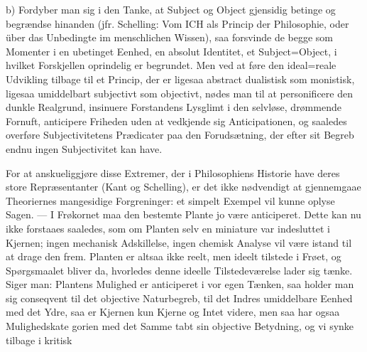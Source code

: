 \documentclass[12pt]{book}
\newcommand{\opage}[1]{\marginnote{\footnotesize\textit{[#1]}}}
\begin{document}
b) Fordyber man sig i den Tanke, at Subject og Object gjensidig betinge og begrændse
hinanden (jfr. Schelling: Vom ICH als Princip der Philosophie, oder über das Unbedingte
im menschlichen Wissen), saa forsvinde de begge som Momenter i en ubetinget Eenhed, en
absolut Identitet, et Subject=Object, i hvilket Forskjellen oprindelig er begrundet. Men
ved at føre den ideal=reale Udvikling tilbage til et Princip, der er ligesaa abstract
dualistisk som monistisk, ligesaa umiddelbart subjectivt som objectivt, nødes man til at
personificere den dunkle Realgrund, insinuere Forstandens Lysglimt i den selvløse,
drømmende Fornuft, anticipere Friheden uden at vedkjende sig Anticipationen, og saaledes
overføre Subjectivitetens Prædicater paa den Forudsætning, der efter sit Begreb endnu
ingen Subjectivitet kan have.

For at anskueliggjøre disse Extremer, der i Philosophiens Historie have deres store
Repræsentanter (Kant og Schelling), er det ikke nødvendigt at gjennemgaae Theoriernes
mangesidige Forgreninger: et simpelt Exempel vil kunne oplyse Sagen. --- I Frøkornet
maa den bestemte Plante jo være anticiperet. Dette kan nu ikke forstaaes saaledes, som
om Planten selv en miniature var indesluttet i Kjernen; ingen mechanisk Adskillelse,
ingen chemisk Analyse vil være istand til at drage den frem. Planten er altsaa ikke
reelt, men ideelt tilstede i Frøet, og Spørgsmaalet bliver da, hvorledes denne ideelle
Tilstedeværelse lader sig tænke. Siger man: Plantens Mulighed er anticiperet i vor egen
Tænken, saa holder man sig conseqvent til det objective Naturbegreb, til det Indres
umiddelbare Eenhed med det Ydre, saa er Kjernen kun Kjerne og Intet videre, men saa har
ogsaa Mulighedskate%
\opage{207}%
%
%
gorien med det Samme tabt sin objective Betydning, og vi synke tilbage i kritisk
\end{document}
